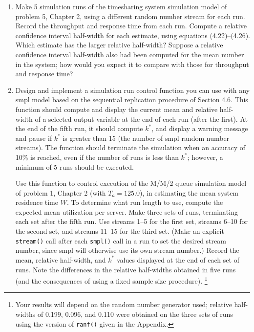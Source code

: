 \begin{enumerate}
\setlength{\itemsep}{0pt}\setlength{\parskip}{0pt}
\item Make 5 simulation runs of the timesharing system simulation model of
  problem 5, Chapter 2, using a different random number stream for each run.
  Record the throughput and response time from each run. Compute a relative
  confidence interval half-width for each estimate, using equations
  (4.22)--(4.26). Which estimate has the larger relative half-width? Suppose a
  relative confidence interval half-width also had been computed for the mean
  number in the system; how would you expect it to compare with those for
  throughput and response time?

\item Design and implement a simulation run control function you can use with
  any smpl model based on the sequential replication procedure of Section 4.6.
  This function should compute and display the current mean and relative
  half-width of a selected output variable at the end of each run (after the
  first). At the end of the fifth run, it should compute $k^*$, and display a
  warning message and pause if $k^*$ is greater than 15 (the number of smpl
  random number streams). The function should terminate the simulation when an
  accuracy of 10\% is reached, even if the number of runs is less than $k^*$;
  however, a minimum of 5 runs should be executed.

  Use this function to control execution of the M/M/2 queue simulation model of
  problem 1, Chapter 2 (with $T_a = 125.0$), in estimating the mean system
  residence time $W$. To determine what run length to use, compute the expected
  mean utilization per server. Make three sets of runs, terminating each set
  after the fifth run. Use streams 1--5 for the first set, streams 6--10 for the
  second set, and streams 11--15 for the third set. (Make an explicit
  \texttt{stream()} call after each \texttt{smpl()} call in a run to set the
  desired stream number, since smpl will otherwise use its own stream number.)
  Record the mean, relative half-width, and $k^*$ values displayed at the end of
  each set of runs. Note the differences in the relative half-widths obtained
  in five runs (and the consequences of using a fixed sample size procedure).%
  \footnote{Your results will depend on the random number generator used;
  relative half-widths of 0.199, 0.096, and 0.110 were obtained on the three
  sets of runs using the version of \texttt{ranf()} given in the Appendix.}


\end{enumerate}
